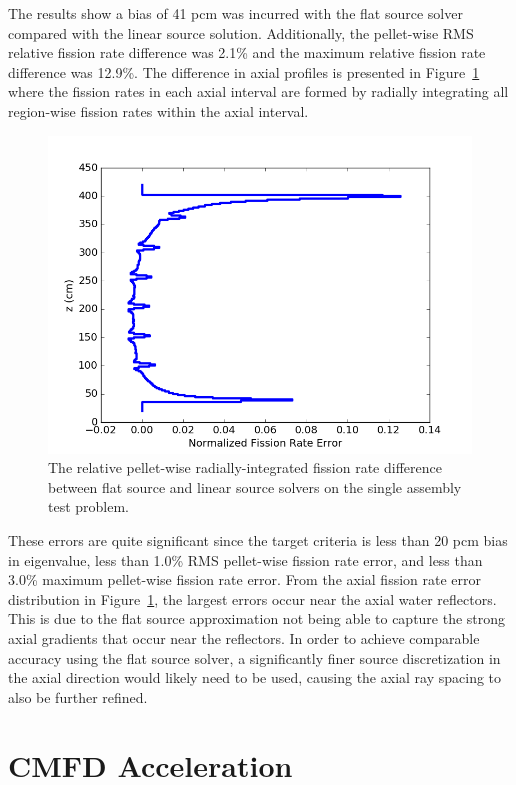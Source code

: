 The results show a bias of 41 pcm was incurred with the flat source solver compared with the linear source solution. Additionally, the pellet-wise \ac{RMS} relative fission rate difference was 2.1\% and the maximum relative fission rate difference was 12.9\%. The difference in axial profiles is presented in Figure~\ref{fig:fs-ls-axial-diff} where the fission rates in each axial interval are formed by radially integrating all region-wise fission rates within the axial interval.

\begin{figure}[h!]
	\centering
	\includegraphics[width=0.7\linewidth]{figures/results/error-plots/sa_fs_axial_error.png}
	\caption[]{The relative pellet-wise radially-integrated fission rate difference between flat source and linear source solvers on the single assembly test problem.}
	\label{fig:fs-ls-axial-diff}
\end{figure}

These errors are quite significant since the target criteria is less than 20 pcm bias in eigenvalue, less than 1.0\% \ac{RMS} pellet-wise fission rate error, and less than 3.0\% maximum pellet-wise fission rate error. From the axial fission rate error distribution in Figure~\ref{fig:fs-ls-axial-diff}, the largest errors occur near the axial water reflectors. This is due to the flat source approximation not being able to capture the strong axial gradients that occur near the reflectors. In order to achieve comparable accuracy using the flat source solver, a significantly finer source discretization in the axial direction would likely need to be used, causing the axial ray spacing to also be further refined. 

\section{CMFD Acceleration}
\label{sec:cmfd-convergence-params}

